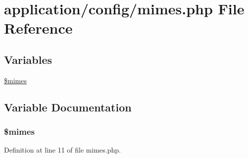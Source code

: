 \hypertarget{mimes_8php}{\section{application/config/mimes.php File Reference}
\label{mimes_8php}
}
\subsection*{Variables}
\begin{DoxyCompactItemize}
\item 
\hyperlink{mimes_8php_a2ce7d338d1fd0f0d971ba6213ac298a2}{\$mimes}
\end{DoxyCompactItemize}


\subsection{Variable Documentation}
\hypertarget{mimes_8php_a2ce7d338d1fd0f0d971ba6213ac298a2}{
\subsubsection[{\$mimes}]{\setlength{\rightskip}{0pt plus 5cm}\$mimes}}\label{mimes_8php_a2ce7d338d1fd0f0d971ba6213ac298a2}


Definition at line 11 of file mimes.\-php.


